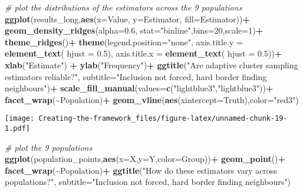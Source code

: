 \documentclass[
]{article}
\newenvironment{Shaded}{\begin{snugshade}}{\end{snugshade}}
\newcommand{\AttributeTok}[1]{\textcolor[rgb]{0.13,0.29,0.53}{#1}}
\newcommand{\CommentTok}[1]{\textcolor[rgb]{0.56,0.35,0.01}{\textit{#1}}}
\newcommand{\DecValTok}[1]{\textcolor[rgb]{0.00,0.00,0.81}{#1}}
\newcommand{\FloatTok}[1]{\textcolor[rgb]{0.00,0.00,0.81}{#1}}
\newcommand{\FunctionTok}[1]{\textcolor[rgb]{0.13,0.29,0.53}{\textbf{#1}}}
\newcommand{\NormalTok}[1]{#1}
\newcommand{\SpecialCharTok}[1]{\textcolor[rgb]{0.81,0.36,0.00}{\textbf{#1}}}
\newcommand{\StringTok}[1]{\textcolor[rgb]{0.31,0.60,0.02}{#1}}
\begin{document}
\begin{Shaded}
\begin{Highlighting}[]
\CommentTok{\# plot the distributions of the estimators across the 9 populations}
\FunctionTok{ggplot}\NormalTok{(results\_long,}\FunctionTok{aes}\NormalTok{(}\AttributeTok{x=}\NormalTok{Value, }\AttributeTok{y=}\NormalTok{Estimator, }\AttributeTok{fill=}\NormalTok{Estimator))}\SpecialCharTok{+}
  \FunctionTok{geom\_density\_ridges}\NormalTok{(}\AttributeTok{alpha=}\FloatTok{0.6}\NormalTok{, }\AttributeTok{stat=}\StringTok{"binline"}\NormalTok{,}\AttributeTok{bins=}\DecValTok{20}\NormalTok{,}\AttributeTok{scale=}\DecValTok{1}\NormalTok{)}\SpecialCharTok{+}
  \FunctionTok{theme\_ridges}\NormalTok{()}\SpecialCharTok{+}
  \FunctionTok{theme}\NormalTok{(}\AttributeTok{legend.position=}\StringTok{"none"}\NormalTok{,}
        \AttributeTok{axis.title.y =} \FunctionTok{element\_text}\NormalTok{( }\AttributeTok{hjust =} \FloatTok{0.5}\NormalTok{),}
        \AttributeTok{axis.title.x =} \FunctionTok{element\_text}\NormalTok{( }\AttributeTok{hjust =} \FloatTok{0.5}\NormalTok{))}\SpecialCharTok{+}
  \FunctionTok{xlab}\NormalTok{(}\StringTok{"Estimate"}\NormalTok{) }\SpecialCharTok{+}
  \FunctionTok{ylab}\NormalTok{(}\StringTok{"Frequency"}\NormalTok{)}\SpecialCharTok{+}
  \FunctionTok{ggtitle}\NormalTok{(}\StringTok{"Are adaptive cluster sampling estimators reliable?"}\NormalTok{,}
          \AttributeTok{subtitle=}\StringTok{"Inclusion not forced, hard border finding neighbours"}\NormalTok{)}\SpecialCharTok{+}
  \FunctionTok{scale\_fill\_manual}\NormalTok{(}\AttributeTok{values=}\FunctionTok{c}\NormalTok{(}\StringTok{"lightblue3"}\NormalTok{,}\StringTok{"lightblue3"}\NormalTok{))}\SpecialCharTok{+}
  \FunctionTok{facet\_wrap}\NormalTok{(}\SpecialCharTok{\textasciitilde{}}\NormalTok{Population)}\SpecialCharTok{+}
  \FunctionTok{geom\_vline}\NormalTok{(}\FunctionTok{aes}\NormalTok{(}\AttributeTok{xintercept=}\NormalTok{Truth),}\AttributeTok{color=}\StringTok{"red3"}\NormalTok{)}
\end{Highlighting}
\end{Shaded}

\texttt{[image: Creating-the-framework\_files/figure-latex/unnamed-chunk-19-1.pdf]}

\begin{Shaded}
\begin{Highlighting}[]
\CommentTok{\# plot the 9 populations}
\FunctionTok{ggplot}\NormalTok{(population\_points,}\FunctionTok{aes}\NormalTok{(}\AttributeTok{x=}\NormalTok{X,}\AttributeTok{y=}\NormalTok{Y,}\AttributeTok{color=}\NormalTok{Group))}\SpecialCharTok{+}
  \FunctionTok{geom\_point}\NormalTok{()}\SpecialCharTok{+}
  \FunctionTok{facet\_wrap}\NormalTok{(}\SpecialCharTok{\textasciitilde{}}\NormalTok{Population)}\SpecialCharTok{+}
  \FunctionTok{ggtitle}\NormalTok{(}\StringTok{"How do these estimators vary across populations?"}\NormalTok{,}
          \AttributeTok{subtitle=}\StringTok{"Inclusion not forced, hard border finding neighbours"}\NormalTok{)}
\end{Highlighting}
\end{Shaded}
\end{document}
